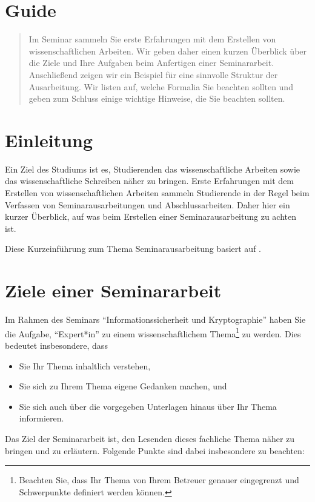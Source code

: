 \section*{Guide}

\begin{abstract}
Im Seminar sammeln Sie erste Erfahrungen mit dem Erstellen von wissenschaftlichen Arbeiten.
Wir geben daher einen kurzen Überblick über die Ziele und Ihre Aufgaben beim Anfertigen einer
Seminararbeit.
Anschließend zeigen wir ein Beispiel für eine sinnvolle Struktur der Ausarbeitung.
Wir listen auf, welche Formalia Sie beachten sollten und geben zum Schluss einige wichtige Hinweise,
die Sie beachten sollten.
\end{abstract}

\section{Einleitung}
Ein Ziel des Studiums ist es, Studierenden das wissenschaftliche Arbeiten sowie
das wissenschaftliche Schreiben näher zu bringen. Erste Erfahrungen mit dem
Erstellen von wissenschaftlichen Arbeiten sammeln Studierende in der Regel
beim Verfassen von Seminarausarbeitungen und Abschlussarbeiten. Daher hier ein
kurzer Überblick, auf was beim Erstellen einer Seminarausarbeitung zu achten
ist.

\medskip Diese Kurzeinführung zum Thema Seminarausarbeitung basiert auf \cite{LIB,BOH07,KAR}.


\section{Ziele einer Seminararbeit}
Im Rahmen des Seminars ``Informationssicherheit und Kryptographie'' haben Sie die Aufgabe,
``Expert*in'' zu einem wissenschaftlichem Thema\footnote{Beachten Sie, dass Ihr Thema von Ihrem
Betreuer genauer eingegrenzt und Schwerpunkte definiert werden können.} zu werden. Dies bedeutet
insbesondere, dass
\begin{itemize}
\item Sie Ihr Thema inhaltlich verstehen,
\item Sie sich zu Ihrem Thema eigene Gedanken machen, und
\item Sie sich auch über die vorgegeben Unterlagen hinaus über Ihr Thema informieren.
\end{itemize}


Das Ziel der Seminararbeit ist, den Lesenden dieses fachliche Thema näher zu bringen und zu
erläutern. Folgende Punkte sind dabei insbesondere zu beachten:

